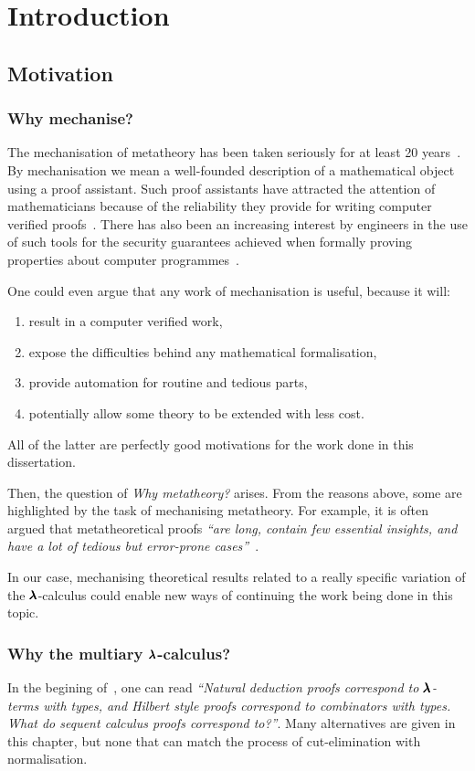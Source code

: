 \chapter{Introduction}
\label{c:intro}

\section{Motivation}
\subsection{Why mechanise?}
The mechanisation of metatheory has been taken seriously for at least 20 years~\cite{POPLmark}.
By mechanisation we mean a well-founded description of a mathematical object using a proof assistant.
Such proof assistants have attracted the attention of mathematicians because of the reliability they provide for writing computer verified proofs~\cite{FourColourThm}.
There has also been an increasing interest by engineers in the use of such tools for the security guarantees achieved when formally proving properties about computer programmes~\cite{CompCert}.

One could even argue that any work of mechanisation is useful, because it will:
\begin{enumerate}
\item result in a computer verified work,
\item expose the difficulties behind any mathematical formalisation,
\item provide automation for routine and tedious parts,
\item potentially allow some theory to be extended with less cost.
\end{enumerate}

All of the latter are perfectly good motivations for the work done in this dissertation.

Then, the question of \textit{Why metatheory?} arises.
From the reasons above, some are highlighted by the task of mechanising metatheory.
For example, it is often argued that metatheoretical proofs \textit{``are long, contain few essential insights, and have a lot of tedious but error-prone cases''}~\cite{AutosubstSchafer}.

In our case, mechanising theoretical results related to a really specific variation of the $\pmb{\lambda}$-calculus could enable new ways of continuing the work being done in this topic.

\subsection{Why the multiary $\pmb{\lambda}$-calculus?}
In the begining of~\cite[Chapter~7.3]{CurryHoward}, one can read \textit{``Natural deduction proofs correspond to $\pmb{\lambda}$-terms with types, and Hilbert style proofs correspond to combinators with types. What do sequent calculus proofs correspond to?''}.
Many alternatives are given in this chapter, but none that can match the process of cut-elimination with normalisation.

